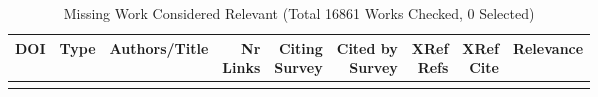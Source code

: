 {\scriptsize
\begin{longtable}{p{5cm}lp{11cm}rrrrrr}
\caption{Missing Work Considered Relevant (Total 16861 Works Checked, 0 Selected)}\\ \toprule
DOI & Type & Authors/Title & \shortstack{Nr\\Links} & \shortstack{Citing\\Survey} & \shortstack{Cited by\\Survey} & \shortstack{XRef\\Refs} & \shortstack{XRef\\Cite} & Relevance\\ \midrule\endhead
\bottomrule
\endfoot
\end{longtable}
}

